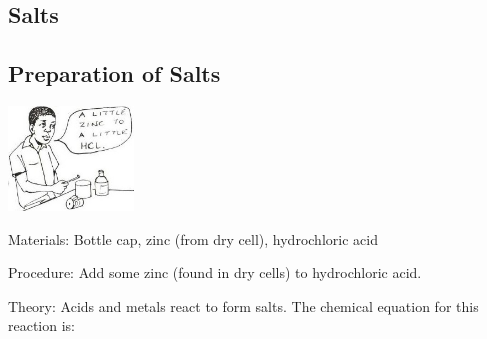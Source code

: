 \begin{multicols}{2}

\section*{Salts}


\subsection{Preparation of Salts}

\begin{center}
\includegraphics[width=0.25\textwidth]{./img/source/salt-acid-metal.jpg}
\end{center}

\begin{description*}
\item[Materials:]{Bottle cap, zinc (from dry cell), hydrochloric acid}
\item[Procedure:]{Add some zinc (found in dry cells) to hydrochloric acid.}
\item[Theory:]{Acids and metals react to form salts. The chemical equation for this reaction is: }
\end{description*}


\end{multicols}
